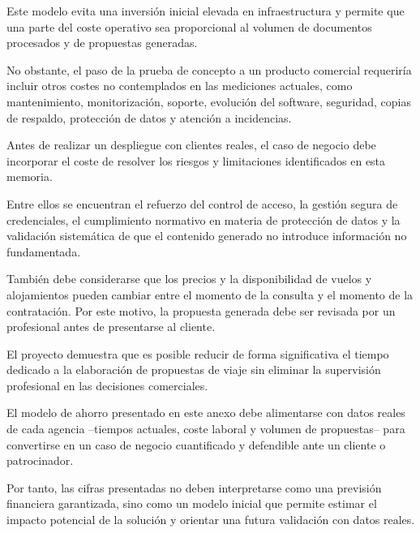 Este modelo evita una inversión inicial elevada en infraestructura y permite que una
parte del coste operativo sea proporcional al volumen de documentos procesados y de
propuestas generadas.

No obstante, el paso de la prueba de concepto a un producto comercial requeriría incluir
otros costes no contemplados en las mediciones actuales, como mantenimiento,
monitorización, soporte, evolución del software, seguridad, copias de respaldo,
protección de datos y atención a incidencias.


Antes de realizar un despliegue con clientes reales, el caso de negocio debe incorporar
el coste de resolver los riesgos y limitaciones identificados en esta memoria.

Entre ellos se encuentran el refuerzo del control de acceso, la gestión segura de
credenciales, el cumplimiento normativo en materia de protección de datos y la
validación sistemática de que el contenido generado no introduce información no
fundamentada.

También debe considerarse que los precios y la disponibilidad de vuelos y alojamientos
pueden cambiar entre el momento de la consulta y el momento de la contratación. Por
este motivo, la propuesta generada debe ser revisada por un profesional antes de
presentarse al cliente.


El proyecto demuestra que es posible reducir de forma significativa el tiempo dedicado
a la elaboración de propuestas de viaje sin eliminar la supervisión profesional en las
decisiones comerciales.

El modelo de ahorro presentado en este anexo debe alimentarse con datos reales de cada
agencia --tiempos actuales, coste laboral y volumen de propuestas-- para convertirse en
un caso de negocio cuantificado y defendible ante un cliente o patrocinador.

Por tanto, las cifras presentadas no deben interpretarse como una previsión financiera
garantizada, sino como un modelo inicial que permite estimar el impacto potencial de la
solución y orientar una futura validación con datos reales.